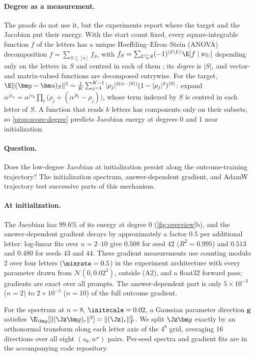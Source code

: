 \paragraph{Degree as a measurement.} The proofs do not use it, but the experiments report where the target and the Jacobian put their
energy. With the start count fixed, every square-integrable function $f$ of the letters has a unique Hoeffding--Efron--Stein (ANOVA)
decomposition $f=\sum_{S\subseteq[n]}f_S$, with $f_S=\sum_{U\subseteq S}(-1)^{|S\setminus U|}\E[f\mid w_U]$ depending only on the letters in $S$ and centred in each
of them \citep{hoeffding1948class,efron1981jackknife,odonnell2014analysis}; its \emph{degree} is $|S|$, and vector- and matrix-valued functions are
decomposed entrywise. For the target, $\E\|(\bm y-\bm u)_S\|^2=\frac{1}{K}\sum_{j=1}^{K-1}|\rho_j|^{2(n-|S|)}(1-|\rho_j|^2)^{|S|}$: expand
$\alpha^{js_n}=\alpha^{js_0}\prod_t\bigl(\rho_j+(\alpha^{jb_t}-\rho_j)\bigr)$, whose term indexed by $S$ is centred in each letter of $S$. A function that reads $k$ letters
has components only on their subsets, so \cref{prop:score-degree} predicts Jacobian energy at degrees $0$ and $1$ near initialization.

\paragraph{Question.} Does the low-degree Jacobian at initialization persist along the outcome-training trajectory?
The initialization spectrum, answer-dependent gradient, and AdamW trajectory test successive parts of this mechanism.

\paragraph{At initialization.} The Jacobian has $99.6\%$ of its energy at degree $0$ (\cref{fig:overview}b), and the answer-dependent
gradient decays by approximately a factor $0.5$ per additional letter: log-linear fits over $n=2$--$10$ give $0.508$ for seed $42$
($R^2=0.995$) and $0.513$ and $0.480$ for seeds $43$ and $44$. These gradient measurements use
counting modulo $2$ over four letters ($\mixrate=0.5$) in the experiment architecture with every parameter drawn from
$\mathcal N(0,0.02^2)$, outside (A2), and a float32 forward pass; gradients are exact over all prompts. The answer-dependent part is only
$5\times10^{-3}$ ($n=2$) to $2\times10^{-5}$ ($n=10$) of the full outcome gradient.

For the spectrum at $n=8$, $\initscale=0.02$, a Gaussian parameter direction $\bm g$ satisfies
$\E_{\bm g}[\|(\Jz\bm g)_r\|^2]=\|(\Jz)_r\|_F^2$.
We split $\Jz\bm g$ exactly by an orthonormal transform along each letter axis of the $4^8$ grid,
averaging $16$ directions over all eight $(s_0,w^\star)$ pairs. Per-seed spectra and gradient fits are in the accompanying code repository.




